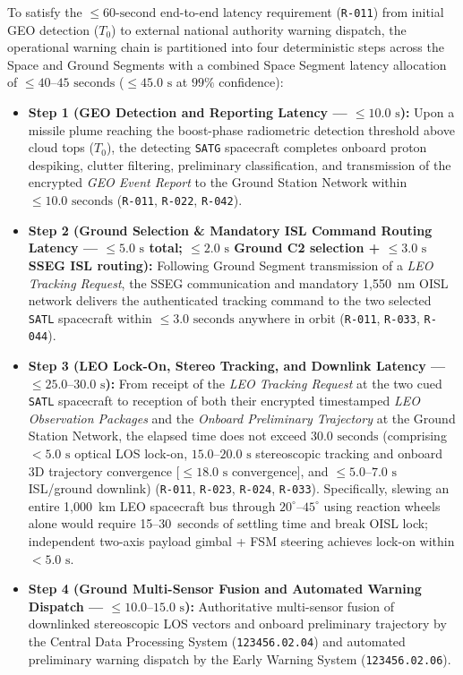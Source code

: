 \documentclass[11pt,a4paper]{article}
\providecommand{\abbr}[1]{#1}
\begin{document}
To satisfy the $\le 60\text{-second}$ end-to-end latency requirement (\texttt{R-011}) from initial \abbr{GEO} detection ($T_0$) to external national authority warning dispatch, the operational warning chain is partitioned into four deterministic steps across the Space and Ground Segments with a combined Space Segment latency allocation of $\le 40\text{--}45\text{ seconds}$ ($\le 45.0\text{ s}$ at $99\%$ confidence):
\begin{itemize}
    \item \textbf{Step 1 (\abbr{GEO} Detection and Reporting Latency --- $\le 10.0\text{ s}$):} Upon a missile plume reaching the boost-phase radiometric detection threshold above cloud tops ($T_0$), the detecting \texttt{SATG} spacecraft completes onboard proton despiking, clutter filtering, preliminary classification, and transmission of the encrypted \emph{GEO Event Report} to the Ground Station Network within $\le 10.0\text{ seconds}$ (\texttt{R-011}, \texttt{R-022}, \texttt{R-042}).
    \item \textbf{Step 2 (Ground Selection \& Mandatory \abbr{ISL} Command Routing Latency --- $\le 5.0\text{ s}$ total; $\le 2.0\text{ s}$ Ground C2 selection + $\le 3.0\text{ s}$ \abbr{SSEG} \abbr{ISL} routing):} Following Ground Segment transmission of a \emph{LEO Tracking Request}, the \abbr{SSEG} communication and mandatory 1,550~nm \abbr{OISL} network delivers the authenticated tracking command to the two selected \texttt{SATL} spacecraft within $\le 3.0\text{ seconds}$ anywhere in orbit (\texttt{R-011}, \texttt{R-033}, \texttt{R-044}).
    \item \textbf{Step 3 (\abbr{LEO} Lock-On, Stereo Tracking, and Downlink Latency --- $\le 25.0\text{--}30.0\text{ s}$):} From receipt of the \emph{LEO Tracking Request} at the two cued \texttt{SATL} spacecraft to reception of both their encrypted timestamped \emph{LEO Observation Packages} and the \emph{Onboard Preliminary Trajectory} at the Ground Station Network, the elapsed time does not exceed $30.0\text{ seconds}$ (comprising $< 5.0\text{ s}$ optical \abbr{LOS} lock-on, $15.0\text{--}20.0\text{ s}$ stereoscopic tracking and onboard 3D trajectory convergence [$\le 18.0\text{ s}$ convergence], and $\le 5.0\text{--}7.0\text{ s}$ \abbr{ISL}/ground downlink) (\texttt{R-011}, \texttt{R-023}, \texttt{R-024}, \texttt{R-033}). Specifically, slewing an entire 1,000~km \abbr{LEO} spacecraft bus through $20^\circ\text{--}45^\circ$ using reaction wheels alone would require 15--30~seconds of settling time and break \abbr{OISL} lock; independent two-axis payload gimbal + \abbr{FSM} steering achieves lock-on within $< 5.0\text{ s}$.
    \item \textbf{Step 4 (Ground Multi-Sensor Fusion and Automated Warning Dispatch --- $\le 10.0\text{--}15.0\text{ s}$):} Authoritative multi-sensor fusion of downlinked stereoscopic \abbr{LOS} vectors and onboard preliminary trajectory by the Central Data Processing System (\texttt{123456.02.04}) and automated preliminary warning dispatch by the Early Warning System (\texttt{123456.02.06}).
\end{itemize}
\end{document}
